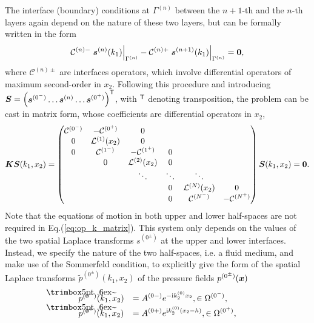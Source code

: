 The interface (boundary) conditions at $\Gamma^{(n)}$ between the $n+1$-th and the $n$-th layers again depend on the nature of these two layers, but can be formally written in the form
    \begin{equation}
        \mathcal C^{(n)-} \left. \boldsymbol s^{(n)}(k_1) \right|_{\Gamma^{(n)}} - \mathcal C^{(n)+} \left. \boldsymbol s^{(n+1)}(k_1) \right|_{\Gamma^{(n)}}= \boldsymbol 0,
        \label{eq:coupling_operators}
    \end{equation}
 where $\mathcal C^{(n)\pm}$ are interfaces operators, which involve differential operators of maximum second-order in $x_2$. Following this procedure and introducing $\boldsymbol S= \begin{pmatrix} \boldsymbol s^{(0^-)}\ldots \boldsymbol s^{(n)} \ldots \boldsymbol s^{(0^+)} \end{pmatrix}^\mathsf T$, with $^\mathsf T$ denoting transposition, the problem can be cast in matrix form, whose coefficients are differential operators in $x_2$,
    \begin{equation} \boldsymbol K \boldsymbol S(k_1, x_2) = 
        \begin{pmatrix}
            \mathcal C^{(0^-)} & -\mathcal C^{(0^+)} & 0 & \\
            0 & \mathcal L^{(1)}(x_2) & 0 &  \\
            0 & \mathcal C^{(1^-)} & -\mathcal C^{(1^+)} & 0   & \\
            & 0 & \mathcal L^{(2)}(x_2)  & 0  & \\
            & & \ddots & \ddots & \ddots \\
            & & & 0 & \mathcal L^{(N)}(x_2)  & 0 \\
            & & & 0 & \mathcal C^{(N^-)} & -\mathcal C^{(N^+)}
        \end{pmatrix}\boldsymbol S (k_1, x_2) = \boldsymbol 0.
        \label{eq:op_k_matrix}
    \end{equation}
Note that the equations of motion in both upper and lower half-spaces are not required in Eq.(\ref{eq:op_k_matrix}). This system only depends on the values of the two spatial Laplace transforms $s^{(0^\pm)}$ at the upper and lower interfaces. Instead, we specify the nature of the two half-spaces, i.e. a fluid medium, and make use of the Sommerfeld condition, to explicitly give the form of the spatial Laplace transforms $\tilde{p}^{(0^\pm)}(k_1,x_2)$ of the pressure fields $p^{(0^\pm)}(\boldsymbol x)$
    \begin{equation}
    \begin{array}{ll}
        \tilde{p}^{(0^-)}(k_1,x_2) &\displaystyle = A^{(0-)} e^{-\im  k_{2}^{(0)} x_2},  \in \Omega^{(0^-)},\\
        \tilde{p}^{(0^+)}(k_1,x_2) &\displaystyle= A^{(0+)} e^{\im  k_{2}^{(0)} (x_2 - h)}, \in \Omega^{(0^+)},\\
        \end{array}
        \label{eq:outgoing_pressure_field}
    \end{equation}

